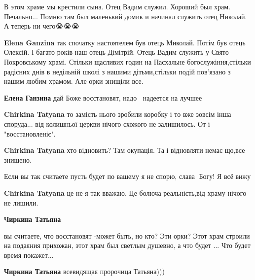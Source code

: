  
 
 
 
 

\qqSecCmt


В этом храме мы крестили сына. Отец Вадим служил. Хороший был храм. Печально...
Помню там был маленький домик и начинал служить отец Николай. А теперь ни
чего😭😭😭

\begin{itemize} %
\textbf{Elena Ganzina} так спочатку настоятелем був отець Миколай. Потім був отець Олексій. І багато років наш отець Дімітрій. Отець Вадим служить у Свято- Покровському храмі. Стільки щасливих годин на Пасхальне богослужіння,стільки радісних днів в недільній школі з нашими дітьми,стільки подій пов'язано з нашим любим храмом. Але орки знищіли все.

\textbf{Елена Ганзина} дай Боже восстановят, надо🙏💕 надеется на лучшее

\begin{itemize} %
\textbf{Chirkina Tatyana} то замість нього зробили коробку і то вже зовсім інша споруда... від колишньої церкви нічого схожого не залишилось. От і "восстановленіє".

\textbf{Chirkina Tatyana} хто відновить? Там окупація. Та і відновляти немає що,все знищено.


Если вы так считаете пусть будет по вашему я не спорю, слава🙏 Богу! Я всё вижу

\textbf{Chirkina Tatyana} це не я так вважаю. Це болюча реальність,від храму нічого не лишили.

\textbf{Чиркина Татьяна} 

вы считаете, что восстановят -может быть, но кто? Эти орки? Этот храм строили на
подаяния прихожан, этот храм был светлым душевно, а что будет ... Что будет время
покажет...

\textbf{Чиркина Татьяна} всевидящая пророчица Татьяна)))


\end{itemize}
\end{itemize}

